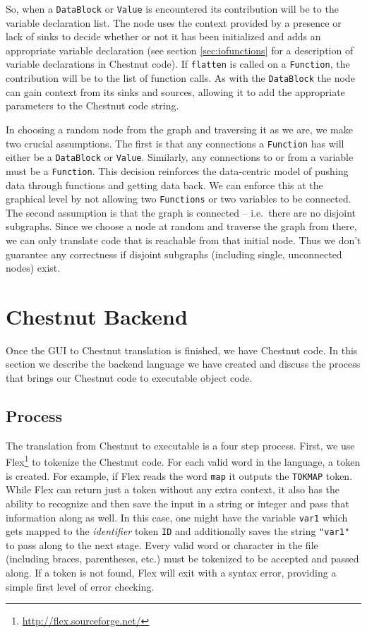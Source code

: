 \documentclass[twocolumn]{article}
\renewcommand{\|}{\origbar} %
\newcommand{\code}[1]{\texttt{#1}}
\begin{document}
So, when a \code{DataBlock} or \code{Value} is encountered its contribution will be to the variable declaration list. The node uses the context provided by a presence or lack of sinks to decide whether or not it has been initialized and adds an appropriate variable declaration (see section \ref{sec:iofunctions} for a description of variable declarations in Chestnut code). If \code{flatten} is called on a \code{Function}, the contribution will be to the list of function calls. As with the \code{DataBlock} the node can gain context from its sinks and sources, allowing it to add the appropriate parameters to the Chestnut code string.

In choosing a random node from the graph and traversing it as we are, we make two crucial assumptions. The first is that any connections a \code{Function} has will either be a \code{DataBlock} or \code{Value}. Similarly, any connections to or from a variable must be a \code{Function}. This decision reinforces the data-centric model of pushing data through functions and getting data back. We can enforce this at the graphical level by not allowing two \code{Functions} or two variables to be connected. The second assumption is that the graph is connected -- i.e.\ there are no disjoint subgraphs. Since we choose a node at random and traverse the graph from there, we can only translate code that is reachable from that initial node. Thus we don't guarantee any correctness if disjoint subgraphs (including single, unconnected nodes) exist.

\section{Chestnut Backend}
\label{sec:chestnutBackend}

Once the GUI to Chestnut translation is finished, we have Chestnut code. In this section we describe the backend language we have created and discuss the process that brings our Chestnut code to executable object code.

\subsection{Process}

The translation from Chestnut to executable is a four step process. First, we use Flex\footnote{\url{http://flex.sourceforge.net/}} to tokenize the Chestnut code. For each valid word in the language, a token is created. For example, if Flex reads the word \code{map} it outputs the \code{TOKMAP} token. While Flex can return just a token without any extra context, it also has the ability to recognize and then save the input in a string or integer and pass that information along as well. In this case, one might have the variable \code{var1} which gets mapped to the {\em identifier} token \code{ID} and additionally saves the string \code{"var1"} to pass along to the next stage. Every valid word or character in the file (including braces, parentheses, etc.) must be tokenized to be accepted and passed along. If a token is not found, Flex will exit with a syntax error, providing a simple first level of error checking. 
\end{document}
